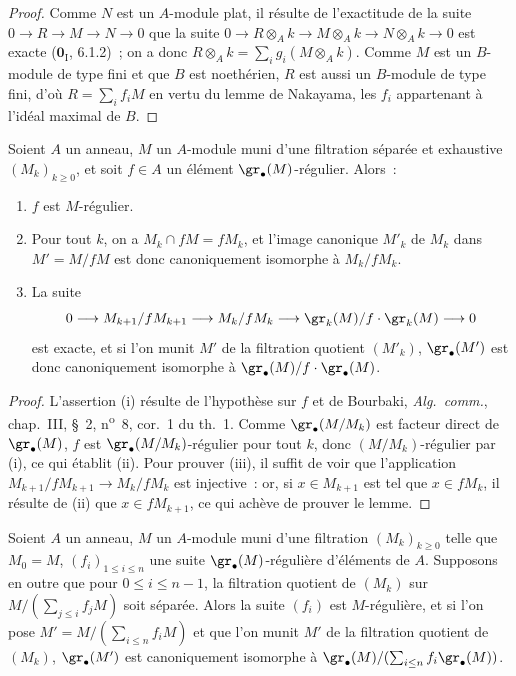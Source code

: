 \begin{proof}
Comme $N$ est un $A$-module plat, il résulte de l'exactitude de la suite
$0\to R\to M\to N\to0$ que la suite
$0\to R\otimes_A k\to M\otimes_A k\to N\otimes_A k\to0$
est exacte ($\mathbf{0}_{\mathrm I}$, 6.1.2)~; on a donc
$R\otimes_A k=\sum_i g_i(M\otimes_A k)$. Comme $M$ est un $B$-module de type
fini et que $B$ est noethérien, $R$ est aussi un $B$-module de type fini,
d'où $R=\sum_i f_iM$ en vertu du lemme de Nakayama, les $f_i$ appartenant à
l'idéal maximal de $B$.
\end{proof}

\begin{lemma}[15.1.18]
\label{0.15.1.18-fr}
Soient $A$ un anneau, $M$ un $A$-module muni d'une filtration séparée et
exhaustive $(M_k)_{k\geq0}$, et soit $f\in A$ un élément
$\gr_\bullet(M)$-régulier. Alors~:
\begin{enumerate}
  \item[\textup{(i)}] $f$ est $M$-régulier.
  \item[\textup{(ii)}] Pour tout $k$, on a $M_k\cap fM=fM_k$, et l'image canonique
  $M'_k$ de $M_k$ dans $M'=M/fM$ est donc canoniquement isomorphe à
  $M_k/fM_k$.
  \item[\textup{(iii)}] La suite
  \[
    0\longrightarrow M_{k+1}/fM_{k+1}\longrightarrow M_k/fM_k
    \longrightarrow\gr_k(M)/f\cdot\gr_k(M)\longrightarrow0
  \]
  est exacte, et si l'on munit $M'$ de la filtration quotient $(M'_k)$,
  $\gr_\bullet(M')$ est donc canoniquement isomorphe à
  $\gr_\bullet(M)/f\cdot\gr_\bullet(M)$.
\end{enumerate}
\end{lemma}

\begin{proof}
L'assertion (i) résulte de l'hypothèse sur $f$ et de Bourbaki,
\emph{Alg.~comm.}, chap.~III, \S~2, n\textsuperscript{o}~8, cor.~1 du th.~1. Comme
$\gr_\bullet(M/M_k)$ est facteur direct de $\gr_\bullet(M)$, $f$ est
$\gr_\bullet(M/M_k)$-régulier pour tout $k$, donc $(M/M_k)$-régulier par
(i), ce qui établit (ii). Pour prouver (iii), il suffit de voir que
l'application $M_{k+1}/fM_{k+1}\to M_k/fM_k$ est injective~: or, si
$x\in M_{k+1}$ est tel que $x\in fM_k$, il résulte de (ii) que
$x\in fM_{k+1}$, ce qui achève de prouver le lemme.
\end{proof}

\begin{proposition}[15.1.19]
\label{0.15.1.19-fr}
Soient $A$ un anneau, $M$ un $A$-module muni d'une filtration
$(M_k)_{k\geq0}$ telle que $M_0=M$, $(f_i)_{1\leq i\leq n}$ une suite
$\gr_\bullet(M)$-régulière d'éléments de $A$. Supposons en outre que pour
$0\leq i\leq n-1$, la filtration quotient de $(M_k)$ sur
$M/(\sum_{j\leq i}f_jM)$
soit séparée. Alors la suite $(f_i)$ est $M$-régulière, et si l'on pose
$M'=M/(\sum_{i\leq n}f_iM)$
et que l'on munit $M'$ de la filtration quotient de $(M_k)$,
$\gr_\bullet(M')$ est canoniquement isomorphe à
$\gr_\bullet(M)/(\sum_{i\leq n}f_i\gr_\bullet(M))$.
\end{proposition}

